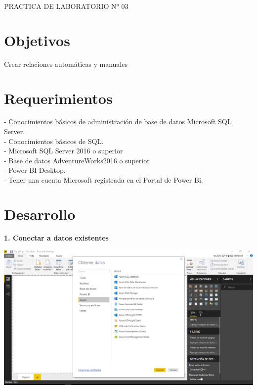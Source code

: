 \begin{center}
    PRACTICA DE LABORATORIO N° 03
\end{center}

\section{Objetivos}
Crear relaciones automáticas y manuales

\section{Requerimientos}

\begin{itemize}

- Conocimientos básicos de administración de base de datos Microsoft   SQL Server.
\\- Conocimientos básicos de SQL.
\\- Microsoft SQL Server 2016 o superior
\\- Base de datos AdventureWorks2016 o superior
\\- Power BI Desktop.
\\- Tener una cuenta Microsoft registrada en el Portal de Power Bi.

\end{itemize}

\section{Desarrollo} 
\textbf{1. Conectar a datos existentes}

\begin{center}
\includegraphics[width=15cm]{./Imagenes/imagen1}
\end{center}

